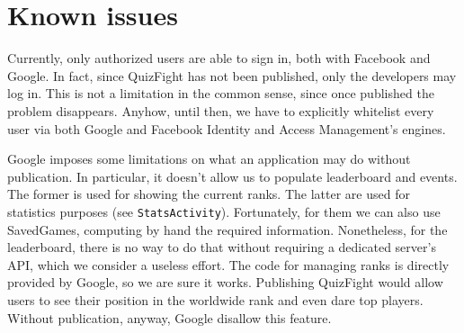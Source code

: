 \section{Known issues}\label{sec:issues}
Currently, only authorized users are able to sign in, both with Facebook and
Google. In fact, since QuizFight has not been published, only the developers
may log in. This is not a limitation in the common sense, since once published
the problem disappears. Anyhow, until then, we have to explicitly whitelist
every user via both Google and Facebook Identity and Access Management's engines. 

Google imposes some limitations on what an application may do without
publication. In particular, it doesn't allow us to populate leaderboard and
events. The former is used for showing the current ranks. The latter are used
for statistics purposes (see \texttt{StatsActivity}). Fortunately, for them we
can also use SavedGames, computing by hand the required information. Nonetheless,
for the leaderboard, there is no way to do that without requiring a dedicated
server's API, which we consider a useless effort. The code for managing ranks
is directly provided by Google, so we are sure it works. Publishing QuizFight
would allow users to see their position in the worldwide rank and even dare top
players. Without publication, anyway, Google disallow this feature.
